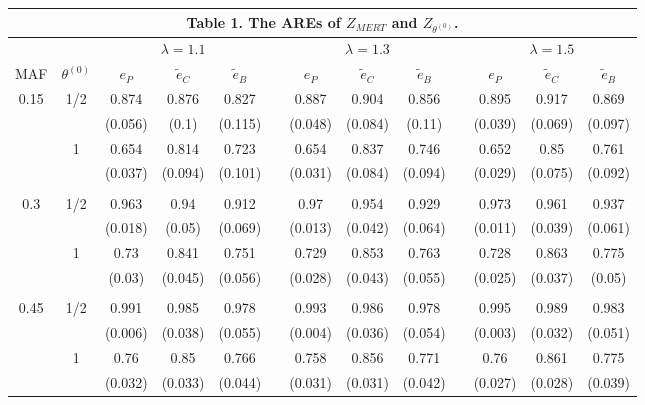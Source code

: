 \documentclass[12pt]{article} %
\begin{document}
\begin{center}
\begin{table}[h]
 \footnotesize
    \begin{tabular}{ccccccccccccc}

    \multicolumn{13}{c}{\bf{Table 1. The AREs of $Z_{MERT}$ and $Z_{\theta^{(0)}}$. }}\\\hline
     &    & \multicolumn{3}{c}{$\lambda=1.1$} &  & \multicolumn{3}{c}{$\lambda=1.3$} &  &\multicolumn{3}{c}{$\lambda=1.5$}\\ \cline{3-5}
     \cline{7-9} \cline{11-13}
MAF  & $\theta^{(0)}$ & $e_P$ & $\tilde{e}_C$ & $\tilde{e}_B$ & & $e_P$& $\tilde{e}_C$  & $\tilde{e}_B$ & & $e_P$ & $\tilde{e}_C$  & $\tilde{e}_B$ \\ \hline
0.15 & 1/2   &0.874&0.876&0.827&&0.887&0.904&0.856&&0.895&0.917&0.869      \\
&&(0.056)&(0.1)&(0.115)&&(0.048)&(0.084)&(0.11)&&(0.039)&(0.069)&(0.097)\\
     & 1    &0.654&0.814&0.723&&0.654&0.837&0.746&&0.652&0.85&0.761        \\
     &&(0.037)&(0.094)&(0.101)&&(0.031)&(0.084)&(0.094)&&(0.029)&(0.075)&(0.092)\\
     \\
0.3 & 1/2   &0.963&0.94&0.912&&0.97&0.954&0.929&&0.973&0.961&0.937      \\
&&(0.018)&(0.05)&(0.069)&&(0.013)&(0.042)&(0.064)&&(0.011)&(0.039)&(0.061)\\
     & 1     &0.73&0.841&0.751&&0.729&0.853&0.763&&0.728&0.863&0.775       \\
     &&(0.03)&(0.045)&(0.056)&&(0.028)&(0.043)&(0.055)&&(0.025)&(0.037)&(0.05)\\\\
     
0.45 & 1/2  &0.991&0.985&0.978&&0.993&0.986&0.978&&0.995&0.989&0.983          \\
&&(0.006)&(0.038)&(0.055)&&(0.004)&(0.036)&(0.054)&&(0.003)&(0.032)&(0.051)\\

     & 1    &0.76&0.85&0.766&&0.758&0.856&0.771&&0.76&0.861&0.775       \\
     &&(0.032)&(0.033)&(0.044)&&(0.031)&(0.031)&(0.042)&&(0.027)&(0.028)&(0.039)\\
\hline
	\end{tabular}
	\end{table}
\end{center}
\vspace{3mm}
\end{document}
